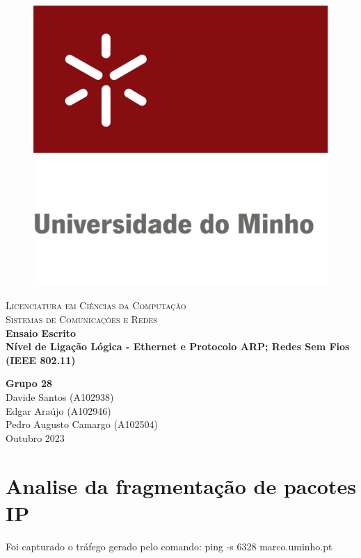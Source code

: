 \documentclass{article}
\begin{document}
\begin{titlepage}

\center %

\newcommand{\HRule}{\rule{\linewidth}{0.4mm}} %

\begin{figure}[h]
    \centering
    \includegraphics[width=0.24\linewidth]{images/uniMinho.jpg}
\end{figure}

\textsc{\Large Licenciatura em Ciências da Computação}\\[0.4cm] %
\textsc{\Large Sistemas de Comunicações e Redes}\\[5cm]

{\Large\bfseries Ensaio Escrito}\\[0.5cm]
{\LARGE \bfseries   Nível de Ligação Lógica - Ethernet e Protocolo ARP; Redes Sem Fios (IEEE 802.11)} %


\vspace{5cm} %
{\bfseries Grupo 28} \\ \vspace{3mm}
Davide Santos (A102938) \\ \vspace{3mm}
Edgar Araújo (A102946) \\ \vspace{3mm}
Pedro Augusto Camargo (A102504) \\ \vspace{3mm}
\vspace{0.2cm}
{Outubro 2023}\\[0.2cm] %

\vfill %
\end{titlepage}

\tableofcontents
\pagebreak

\section{Analise da fragmentação de pacotes IP}
Foi capturado o tráfego gerado pelo comando: ping -s 6328 marco.uminho.pt
\end{document}
